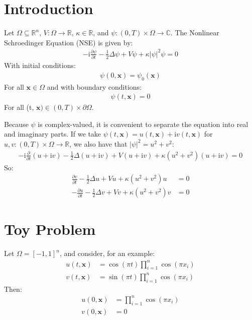 \documentclass{article}
\newcommand{\bvec}[1]{\boldsymbol{#1}}
\newcommand{\ii}{\mathrm{i}}
\begin{document}
\section{Introduction}

Let $\Omega \subseteq \mathbb{R}^n$,
$V : \Omega \rightarrow \mathbb{R}$,
$\kappa \in \mathbb{R}$,
and $\psi : (0, T) \times \Omega \rightarrow \mathbb{C}$.
The Nonlinear Schroedinger Equation (NSE) is given by:
\begin{align*}
-\ii \frac{\partial \psi}{\partial t} - \frac{1}{2} \Delta \psi + V \psi + \kappa |\psi|^2 \psi = 0
\end{align*}
\noindent With initial conditions:
\begin{align*}
\psi(0, \bvec{x}) = \psi_0(\bvec{x})
\end{align*}
\noindent For all $\bvec{x} \in \Omega$ and with boundary conditions:
\begin{align*}
\psi(t, \bvec{x}) = 0
\end{align*}
\noindent For all (t, $\bvec{x}) \in (0, T) \times \partial \Omega$.

Because $\psi$ is complex-valued, it is convenient to separate the equation into real and imaginary parts.
If we take $\psi(t, \bvec{x}) = u(t, \bvec{x}) + \ii v(t, \bvec{x})$
for $u, v : (0, T) \times \Omega \rightarrow \mathbb{R}$,
we also have that $|\psi|^2 = u^2 + v^2$:
\begin{align*}
    -\ii \frac{\partial}{\partial t} (u + \ii v) - \frac{1}{2} \Delta (u + \ii v)
            + V (u + \ii v) + \kappa (u^2 + v^2) (u + \ii v)
        = 0
\end{align*}
\noindent So:
\begin{align*}
    \frac{\partial v}{\partial t} - \frac{1}{2} \Delta u + V u + \kappa (u^2 + v^2) u & = 0 \\
    -\frac{\partial u}{\partial t} - \frac{1}{2} \Delta v + V v + \kappa (u^2 + v^2) v & = 0
\end{align*}

\newpage

\section{Toy Problem}

Let $\Omega = [-1, 1]^n$, and consider, for an example:
\begin{align*}
    u(t, \bvec{x}) & = \cos(\pi t) \prod_{i = 1}^n \cos(\pi x_i) \\
    v(t, \bvec{x}) & = \sin(\pi t) \prod_{i = 1}^n \cos(\pi x_i)
\end{align*}
\noindent Then:
\begin{align*}
    u(0, \bvec{x}) & = \prod_{i = 1}^n \cos(\pi x_i) \\
    v(0, \bvec{x}) & = 0
\end{align*}
\end{document}
